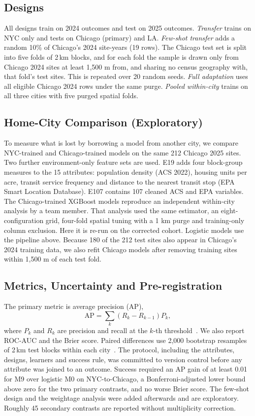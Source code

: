 \documentclass[conference]{IEEEtran}
\begin{document}
\subsection{Designs}
All designs train on 2024 outcomes and test on 2025 outcomes.
\textit{Transfer} trains on NYC only and tests on Chicago (primary) and LA.
\textit{Few-shot transfer} adds a random 10\% of Chicago's 2024 site-years (19 rows). The Chicago test set is split
into five folds of 2\,km blocks, and for each fold the sample is drawn only from Chicago 2024 sites at least 1,500 m
from, and sharing no census geography with, that fold's test sites. This is repeated over 20 random seeds.
\textit{Full adaptation} uses all eligible Chicago 2024 rows under the same purge.
\textit{Pooled within-city} trains on all three cities with five purged spatial folds.

\subsection{Home-City Comparison (Exploratory)}
To measure what is lost by borrowing a model from another city, we compare NYC-trained and Chicago-trained models
on the same 212 Chicago 2025 sites. Two further environment-only feature sets are used. E19 adds four block-group
measures to the 15 attributes: population density (ACS 2022), housing units per acre, transit service frequency and
distance to the nearest transit stop (EPA Smart Location Database). E107 contains 107 cleaned ACS and EPA
variables. The Chicago-trained XGBoost models reproduce an independent within-city analysis by a team member. That
analysis used the same estimator, an eight-configuration grid, four-fold spatial tuning with a 1 km purge and
training-only column exclusion. Here it is re-run on the corrected cohort. Logistic models use the pipeline above.
Because 180 of the 212 test sites also appear in Chicago's 2024 training data, we also refit Chicago models after
removing training sites within 1,500 m of each test fold.

\subsection{Metrics, Uncertainty and Pre-registration}
The primary metric is average precision (AP),
\begin{equation}
\mathrm{AP}=\sum_{k}\left(R_k-R_{k-1}\right)P_k,\label{eq:ap}
\end{equation}
where $P_k$ and $R_k$ are precision and recall at the $k$-th threshold~\cite{saito2015}. We also report ROC-AUC and
the Brier score. Paired differences use 2,000 bootstrap resamples of 2\,km test blocks within each city~\cite{efron1993}.
The protocol, including the attributes, designs, learners and success rule, was committed to version control before
any attribute was joined to an outcome. Success required an AP gain of at least 0.01 for M9 over logistic M0 on
NYC-to-Chicago, a Bonferroni-adjusted lower bound above zero for the two primary contrasts, and no worse Brier
score. The few-shot design and the weightage analysis were added afterwards and are exploratory. Roughly 45
secondary contrasts are reported without multiplicity correction.
\end{document}
